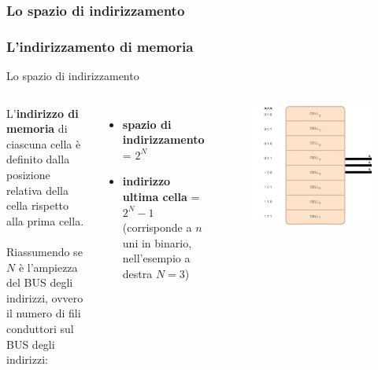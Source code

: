 \subsubsection[Lo spazio di indirizzamento]{Lo spazio di indirizzamento}
\begin{frame}
	\frametitle{L'indirizzamento di memoria}
	  
	\begin{block}{Lo spazio di indirizzamento}
	
		\begin{columns}			
			L’\textbf{indirizzo di memoria} di ciascuna cella è definito dalla posizione relativa della cella rispetto alla prima cella.\\~\\
			Riassumendo se $N$ è l'ampiezza del BUS degli indirizzi, ovvero il numero di fili conduttori sul BUS degli indirizzi:
			\begin{itemize}
				\item \textbf{spazio di indirizzamento} = $2^N$
				\item \textbf{indirizzo ultima cella} = $2^N - 1$ (corrisponde a $n$ uni in binario, nell'esempio a destra $N=3$)
			\end{itemize}
			
	
			\begin{figure}[!htbp]
				\centering 
				\includegraphics[width=1.0\linewidth]{images/5_memory/memory_address.pdf}
			\end{figure}
		\end{columns}
		
	\end{block}
\end{frame}


